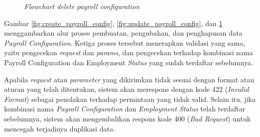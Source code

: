 \begin{figure}[H]
    \centering
    \caption{\textit{Flowchart delete payroll configuration}}
    \label{fig:delete_payroll_config}
\end{figure}

Gambar \ref{fig:create_payroll_config}, \ref{fig:update_payroll_config}, dan \ref{fig:delete_payroll_config} menggambarkan alur proses pembuatan, pengubahan, dan penghapusan data \textit{Payroll Configuration}. Ketiga proses tersebut menerapkan validasi yang sama, yaitu pengecekan \textit{request} dan \textit{params}, dan pengecekan terhadap kombinasi nama Payroll Configuration dan Employment\textit{ Status} yang sudah terdaftar sebelumnya.

Apabila \textit{request} atau \textit{parameter} yang dikirimkan tidak sesuai dengan format atau aturan yang telah ditentukan, sistem akan merespons dengan kode 422 (\textit{Invalid Format}) sebagai penolakan terhadap permintaan yang tidak valid. Selain itu, jika kombinasi nama \textit{Payroll Configuration} dan \textit{Employment Status} telah terdaftar sebelumnya, sistem akan mengembalikan respons kode 400 (\textit{Bad Request}) untuk mencegah terjadinya duplikasi data.

